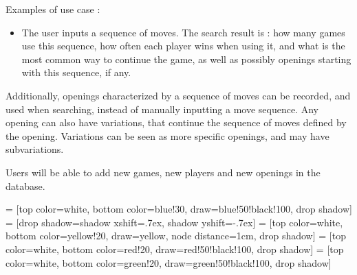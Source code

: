 \documentclass{article}
\begin{document}
Examples of use case :
\begin{itemize}
\item The user inputs a sequence of moves. The search result is : how many games use this sequence,
how often each player wins when using it, and what is the most common way to
continue the game, as well as possibly openings starting with this sequence, if any.
\end{itemize}

Additionally, openings characterized by a sequence of moves can be recorded, and
used when searching, instead of manually inputting a move sequence. 
Any opening can also have variations, that continue the sequence of moves
defined by the opening. Variations can be seen as more specific openings, and
may have subvariations.


Users will be able to add new games, new players and new openings in the database. 


 = [top color=white, bottom color=blue!30, 
                            draw=blue!50!black!100, drop shadow]
 = [drop shadow={shadow xshift=.7ex, 
                                 shadow yshift=-.7ex}]
 = [top color=white, bottom color=yellow!20, 
                               draw=yellow, node distance=1cm, drop shadow]
 = [top color=white, bottom color=red!20, 
                                  draw=red!50!black!100, drop shadow]
 = [top color=white, bottom color=green!20, 
                         draw=green!50!black!100, drop shadow]

\begin{center}
\end{center}
\end{document}
